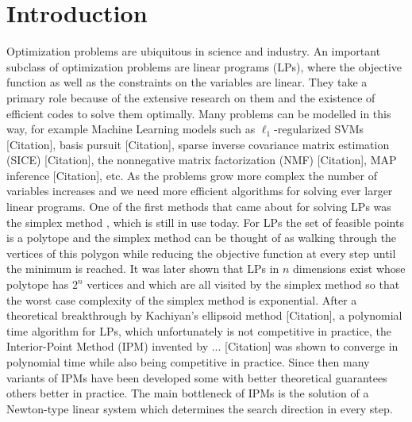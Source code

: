 \chapter{Introduction}


Optimization problems are ubiquitous in science and industry.
An important subclass of optimization problems are linear programs (LPs), where the objective function as well as the constraints on the variables are linear.
They take a primary role because of the extensive research on them and the existence of efficient codes to solve them optimally.
Many problems can be modelled in this way, for example Machine Learning models such as \(\ell_1\)-regularized SVMs [Citation], basis pursuit [Citation], sparse inverse covariance matrix estimation (SICE) [Citation], the nonnegative matrix factorization (NMF) [Citation], MAP inference [Citation], etc. %
As the problems grow more complex the number of variables increases and we need more efficient algorithms for solving ever larger linear programs.
One of the first methods that came about for solving LPs was the simplex method \cite{Dantzig-Simplex}, which is still in use today.
For LPs the set of feasible points is a polytope and the simplex method can be thought of as walking through the vertices of this polygon while reducing the objective function at every step until the minimum is reached.
It was later shown that LPs in \(n\) dimensions exist whose polytope has \(2^n\) vertices and which are all visited by the simplex method so that the worst case complexity of the simplex method is exponential.
After a theoretical breakthrough by Kachiyan's ellipsoid method [Citation], a polynomial time algorithm for LPs, which unfortunately is not competitive in practice, the Interior-Point Method (IPM) invented by ... [Citation] was shown to converge in polynomial time while also being competitive in practice.
Since then many variants of IPMs have been developed some with better theoretical guarantees others better in practice.
The main bottleneck of IPMs is the solution of a Newton-type linear system which determines the search direction in every step.
